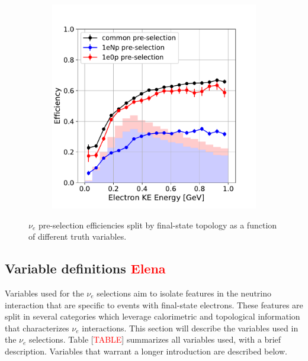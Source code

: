 \documentclass[a4paper]{article}
\begin{document}
\begin{figure}[H]
\begin{center}
\begin{subfigure}[b]{0.3\textwidth}
    \caption{\label{fig:nue:presel:eff:proton} }
    \end{subfigure}
    \begin{subfigure}[b]{0.3\textwidth}
    \centering
    \includegraphics[width=1.00\textwidth]{nueselection/elec_RUN1.pdf}
    \caption{\label{fig:nue:presel:eff:elec} }
    \end{subfigure}
\caption{\label{fig:nue:presel:eff} $\nu_e$ pre-selection efficiencies split by final-state topology as a function of different truth variables.}
\end{center}
\end{figure}

\subsection{Variable definitions \textcolor{red}{Elena}}
\label{sec:nueselection:variables}
\par Variables used for the $\nu_e$ selections aim to isolate features in the neutrino interaction that are specific to events with final-state electrons. These features are split in several categories which leverage calorimetric and topological information that characterizes $\nu_e$ interactions. This section will describe the variables used in the $\nu_e$ selections. Table [\textcolor{red}{TABLE}] summarizes all variables used, with a brief description. Variables that warrant a longer introduction are described below.
\end{document}
